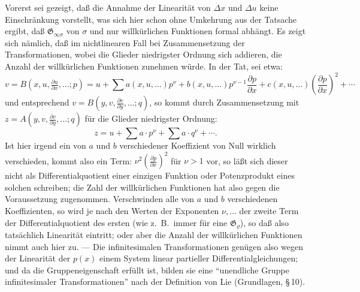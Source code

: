 \documentclass[12pt,a4paper]{article}
\begin{document}
Vorerst sei gezeigt, da\ss{} die Annahme der Linearit\"at von $\Delta x$ und $\Delta u$ keine Einschr\"ankung vorstellt, was sich hier schon ohne Umkehrung aus der Tatsache ergibt, da\ss{} $\mathfrak{G}_{\infty\sigma}$ von $\sigma$ und nur willk\"urlichen Funktionen formal abh\"angt. Es zeigt sich n\"amlich, da\ss{} im nichtlinearen Fall bei Zusammensetzung der Transformationen, wobei die Glieder niedrigster Ordnung sich addieren, die Anzahl der willk\"urlichen Funktionen zunehmen w\"urde. In der Tat, sei etwa:
\[
v=B(x,u,\tfrac{\partial u}{\partial x},\ldots;p)=u+\sum a(x,u,\ldots)p^{\nu}+b(x,u,\ldots)p^{\nu-1}\frac{\partial p}{\partial x}+c(x,u,\ldots)\left(\frac{\partial p}{\partial x}\right)^{2}+\cdots
\]
und entsprechend $v=B(y,v,\tfrac{\partial v}{\partial y},\ldots;q)$, so kommt durch Zusammensetzung mit $z=A(y,v,\tfrac{\partial v}{\partial y},\ldots;q)$ f\"ur die Glieder niedrigster Ordnung:
\[
z=u+\sum a\cdot p^{\nu}+\sum a\cdot q^{\nu}+\cdots.
\]
Ist hier irgend ein von $a$ und $b$ verschiedener Koeffizient von Null wirklich verschieden, kommt also ein Term: $\nu^{2}\left(\tfrac{\partial p}{\partial x}\right)^{2}$ f\"ur $\nu>1$ vor, so l\"a\ss{}t sich dieser nicht als Differentialquotient einer einzigen Funktion oder Potenzprodukt eines solchen schreiben; die Zahl der willk\"urlichen Funktionen hat also gegen die Voraussetzung zugenommen. Verschwinden alle von $a$ und $b$ verschiedenen Koeffizienten, so wird je nach den Werten der Exponenten $\nu,\ldots$ der zweite Term der Differentialquotient des ersten (wie z.\ B.\ immer f\"ur eine $\mathfrak{G}_{\varrho}$), so da\ss{} also tats\"achlich Linearit\"at eintritt; oder aber die Anzahl der willk\"urlichen Funktionen nimmt auch hier zu. --- Die infinitesimalen Transformationen gen\"ugen also wegen der Linearit\"at der $p(x)$ einem System linear partieller Differentialgleichungen; und da die Gruppeneigenschaft erf\"ullt ist, bilden sie eine ``unendliche Gruppe infinitesimaler Transformationen'' nach der Definition von Lie (Grundlagen, \S\,10).
\end{document}
